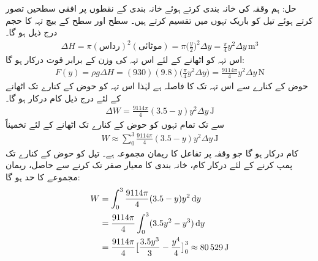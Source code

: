 حل:\quad
ہم وقفہ  کی خانہ بندی کرتے ہوئے خانہ بندی کے نقطوں پر افقی سطحیں تصور کرتے ہوئے تیل کو باریک تہوں میں تقسیم کرتے ہیں۔ سطح  اور سطح  کے بیچ تہہ کا حجم درج ذیل ہو گا۔
\begin{align*}
\Delta H=\pi(\text{رداس})^2(\text{موٹائی})=\pi\big(\frac{y}{2}\big)^2\Delta y=\frac{\pi}{4}y^2\Delta y\,\si{\meter\cubed}
\end{align*}
اس تہہ کو اٹھانے کے لئے اس تہہ کی وزن کے برابر قوت  درکار ہو گا:
\begin{align*}
F(y)=\rho g \Delta H=(930)(9.8)\big(\frac{\pi}{4}y^2\Delta y\big)=\frac{9114\pi}{4}y^2\Delta y\,\si{\newton}
\end{align*}
حوض کے کنارے سے اس تہہ تک کا فاصلہ  ہے  لہٰذا اس تہہ کو حوض کے کنارے تک اٹھانے کے لئے درج ذیل کام درکار ہو گا۔
\begin{align*}
\Delta W=\frac{9114\pi}{4}(3.5-y)y^2\Delta y\,\si{\joule}
\end{align*}
 سے  تک تمام تہوں کو حوض کے کنارے تک اٹھانے کے لئے تخمیناً
\begin{align*}
W\approx\sum_0^{3}\frac{9114\pi}{4}(3.5-y)y^2\Delta y\,\si{\joule}
\end{align*}
کام درکار ہو گا جو وقفہ  پر تفاعل  کا ریمان مجموعہ ہے۔ تیل کو حوض کے کنارے تک پمپ کرنے کے لئے درکار کام، خانہ بندی کا معیار صفر تک کرنے سے حاصل، ریمان مجموعے کا حد ہو گا:
\begin{align*}
W&=\int_0^{3}\frac{9114\pi}{4}(3.5-y)y^2\dif y\\
&=\frac{9114\pi}{4}\int_0^{3}(3.5y^2-y^3)\dif y\\
&=\frac{9114\pi}{4}\big[\frac{3.5y^3}{3}-\frac{y^4}{4}\big]_0^3\approx \SI{80529}{\joule}
\end{align*}


